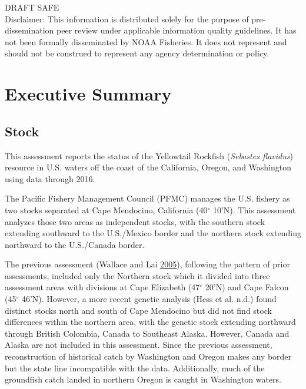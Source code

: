 \documentclass[12pt,]{article}
\begin{document}
\begin{center}
\vfill
DRAFT SAFE\\
Disclaimer: This information is distributed solely for the purpose of pre-dissemination
peer review under applicable information quality guidelines. It has not been formally
disseminated by NOAA Fisheries. It does not represent and should not be construed to
represent any agency determination or policy. 

\vspace{.3cm}

\maketitle

\setcounter{page}{1}
\end{center}

{
\setcounter{tocdepth}{4}
\tableofcontents
}
\setlength{\parskip}{5mm plus1mm minus1mm} \pagebreak

 \setcounter{page}{1}
\renewcommand{\thefigure}{\alph{figure}}
\renewcommand{\thetable}{\alph{table}}

\section*{Executive Summary}\label{executive-summary}

\subsection*{Stock}\label{stock}

This assessment reports the status of the Yellowtail Rockfish
(\emph{Sebastes flavidus}) resource in U.S. waters off the coast of the
California, Oregon, and Washington using data through 2016.

The Pacific Fishery Management Council (PFMC) manages the U.S. fishery
as two stocks separated at Cape Mendocino, California (40\(^\circ\)
10'N). This assessment analyzes those two areas as independent stocks,
with the southern stock extending southward to the U.S./Mexico border
and the northern stock extending northward to the U.S./Canada border.

The previous assessment (Wallace and Lai
\protect\hyperlink{ref-Wallace2005}{2005}), following the pattern of
prior assessments, included only the Northern stock which it divided
into three assessment areas with divisions at Cape Elizabeth
(47\(^\circ\) 20'N) and Cape Falcon (45\(^\circ\) 46'N). However, a more
recent genetic analysis (Hess et al. n.d.) found distinct stocks north
and south of Cape Mendocino but did not find stock differences within
the northern area, with the genetic stock extending northward through
British Colombia, Canada to Southeast Alaska. However, Canada and Alaska
are not included in this assessment. Since the previous assessment,
reconstruction of historical catch by Washington and Oregon makes any
border but the state line incompatible with the data. Additionally, much
of the groundfish catch landed in northern Oregon is caught in
Washington waters.
\end{document}
